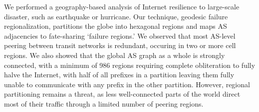     We performed a geography-based analysis of Internet resilience to large-scale disaster, such as earthquake or hurricane.
    Our technique, geodesic failure regionalization, partitions the globe into hexagonal regions and maps AS adjacencies to fate-sharing `failure regions.'
    We observed that most AS-level peering between transit networks is redundant, occuring in two or more cell regions.
    We also showed that the global AS graph as a whole is strongly connected, with a minimum of 986 regions requiring complete obliteration to fully halve the Internet, with half of all prefixes in a partition leaving them fully unable to communicate with any prefix in the other partition.
    However, regional partitioning remains a threat, as less well-connected parts of the world direct most of their traffic through a limited number of peering regions. 
